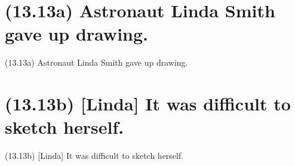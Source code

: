 \documentclass{article}
\begin{document}
\section*{(13.13a) Astronaut Linda Smith gave up drawing.}

\bigbreak
\begin{enumerate*}
\item[(13.13a)] Astronaut Linda Smith gave up drawing.
\end{enumerate*}
\bigbreak

\bigbreak
\begin{minipage}{\textwidth}
\end{minipage}
\bigbreak

\clearpage

%
%

\section*{(13.13b) [Linda] It was difficult to sketch herself.}

\bigbreak
\begin{enumerate*}
\item[(13.13b)] [Linda] It was difficult to sketch herself.
\end{enumerate*}
\bigbreak

\bigbreak
\begin{minipage}{\textwidth}
\end{minipage}
\bigbreak
\end{document}
